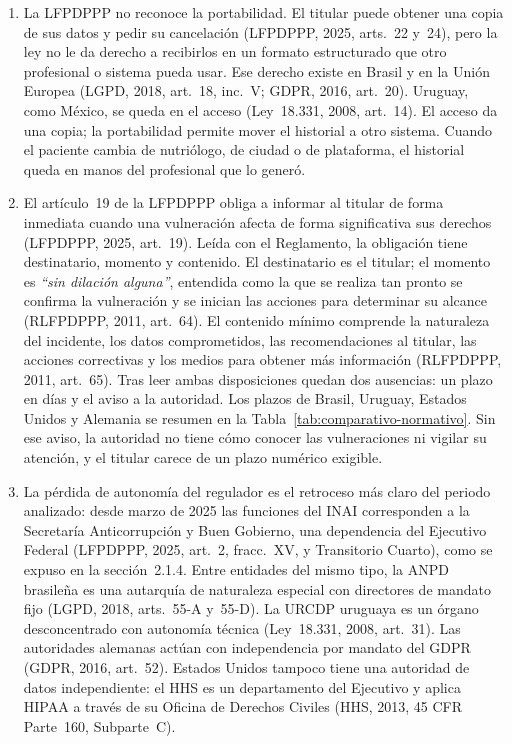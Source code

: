 \documentclass[12pt, a4paper]{article}
\begin{document}
\begin{enumerate}[label=\Roman*.]
 
  \item La LFPDPPP no reconoce la portabilidad. El titular puede
  obtener una copia de sus datos y pedir su cancelación (LFPDPPP,
  2025, arts.~22 y~24), pero la ley no le da derecho a recibirlos en
  un formato estructurado que otro profesional o sistema pueda usar.
  Ese derecho existe en Brasil y en la Unión Europea (LGPD, 2018,
  art.~18, inc.~V; GDPR, 2016, art.~20). Uruguay, como México, se
  queda en el acceso (Ley~18.331, 2008, art.~14). El acceso da una
  copia; la portabilidad permite mover el historial a otro sistema.
  Cuando el paciente cambia de nutriólogo, de ciudad o de
  plataforma, el historial queda en manos del profesional que lo
  generó.
 
  \item El artículo~19 de la LFPDPPP obliga a informar al titular de
  forma inmediata cuando una vulneración afecta de forma significativa
  sus derechos (LFPDPPP, 2025, art.~19). Leída con el Reglamento, la
  obligación tiene destinatario, momento y contenido. El
  destinatario es el titular; el momento es \textit{``sin dilación
  alguna''}, entendida como la que se realiza tan pronto se confirma
  la vulneración y se inician las acciones para determinar su alcance
  (RLFPDPPP, 2011, art.~64). El contenido mínimo comprende la
  naturaleza del incidente, los datos comprometidos, las
  recomendaciones al titular, las acciones correctivas y los medios
  para obtener más información (RLFPDPPP, 2011, art.~65). Tras leer
  ambas disposiciones quedan dos ausencias: un plazo en días y el
  aviso a la autoridad. Los plazos de Brasil, Uruguay, Estados
  Unidos y Alemania se resumen en la
  Tabla~\ref{tab:comparativo-normativo}. Sin ese aviso, la
  autoridad no tiene cómo conocer las vulneraciones ni vigilar su
  atención, y el titular carece de un plazo numérico exigible.
 
  \item La pérdida de autonomía del regulador es el retroceso más
  claro del periodo analizado: desde marzo de 2025 las funciones del
  INAI corresponden a la Secretaría Anticorrupción y Buen Gobierno,
  una dependencia del Ejecutivo Federal (LFPDPPP, 2025, art.~2, fracc.~XV, y Transitorio
  Cuarto), como se expuso en la sección~2.1.4. Entre entidades del mismo
  tipo, la ANPD brasileña es una autarquía de naturaleza especial con
  directores de mandato fijo (LGPD, 2018, arts.~55-A y~55-D). La URCDP
  uruguaya es un órgano desconcentrado con autonomía técnica (Ley~18.331,
  2008, art.~31). Las autoridades alemanas actúan con independencia por
  mandato del GDPR (GDPR, 2016, art.~52). Estados Unidos tampoco tiene una
  autoridad de
  datos independiente: el HHS es un departamento del Ejecutivo y
  aplica HIPAA a través de su Oficina de Derechos Civiles (HHS,
  2013, 45 CFR Parte~160, Subparte~C).
 

\end{enumerate}
\end{document}
